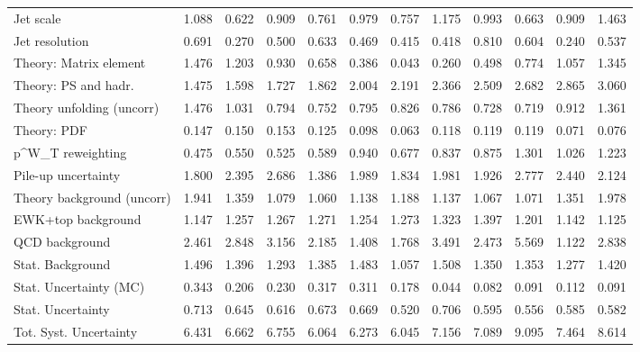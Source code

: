 \begin{tabular}{l|p{0.6cm}p{0.6cm}p{0.6cm}p{0.6cm}p{0.6cm}p{0.6cm}p{0.6cm}p{0.6cm}p{0.6cm}p{0.6cm}p{0.6cm}}
Jet scale                                & 1.088 & 0.622 & 0.909 & 0.761 & 0.979 & 0.757 & 1.175 & 0.993 & 0.663 & 0.909 & 1.463 \\
Jet resolution                           & 0.691 & 0.270 & 0.500 & 0.633 & 0.469 & 0.415 & 0.418 & 0.810 & 0.604 & 0.240 & 0.537 \\
Theory: Matrix element                   & 1.476 & 1.203 & 0.930 & 0.658 & 0.386 & 0.043 & 0.260 & 0.498 & 0.774 & 1.057 & 1.345 \\
Theory: PS and hadr.                     & 1.475 & 1.598 & 1.727 & 1.862 & 2.004 & 2.191 & 2.366 & 2.509 & 2.682 & 2.865 & 3.060 \\
Theory unfolding (uncorr)                & 1.476 & 1.031 & 0.794 & 0.752 & 0.795 & 0.826 & 0.786 & 0.728 & 0.719 & 0.912 & 1.361 \\
Theory: PDF                              & 0.147 & 0.150 & 0.153 & 0.125 & 0.098 & 0.063 & 0.118 & 0.119 & 0.119 & 0.071 & 0.076 \\
p^{W}_{T} reweighting                    & 0.475 & 0.550 & 0.525 & 0.589 & 0.940 & 0.677 & 0.837 & 0.875 & 1.301 & 1.026 & 1.223 \\
Pile-up uncertainty                      & 1.800 & 2.395 & 2.686 & 1.386 & 1.989 & 1.834 & 1.981 & 1.926 & 2.777 & 2.440 & 2.124 \\
Theory background (uncorr)               & 1.941 & 1.359 & 1.079 & 1.060 & 1.138 & 1.188 & 1.137 & 1.067 & 1.071 & 1.351 & 1.978 \\
EWK+top background                       & 1.147 & 1.257 & 1.267 & 1.271 & 1.254 & 1.273 & 1.323 & 1.397 & 1.201 & 1.142 & 1.125 \\
QCD background                           & 2.461 & 2.848 & 3.156 & 2.185 & 1.408 & 1.768 & 3.491 & 2.473 & 5.569 & 1.122 & 2.838 \\
Stat. Background                         & 1.496 & 1.396 & 1.293 & 1.385 & 1.483 & 1.057 & 1.508 & 1.350 & 1.353 & 1.277 & 1.420 \\
Stat. Uncertainty (MC)                   & 0.343 & 0.206 & 0.230 & 0.317 & 0.311 & 0.178 & 0.044 & 0.082 & 0.091 & 0.112 & 0.091 \\
\hline
Stat. Uncertainty                        & 0.713 & 0.645 & 0.616 & 0.673 & 0.669 & 0.520 & 0.706 & 0.595 & 0.556 & 0.585 & 0.582 \\
\hline
Tot. Syst. Uncertainty                   & 6.431 & 6.662 & 6.755 & 6.064 & 6.273 & 6.045 & 7.156 & 7.089 & 9.095 & 7.464 & 8.614 \\
\hline
\end{tabular}
